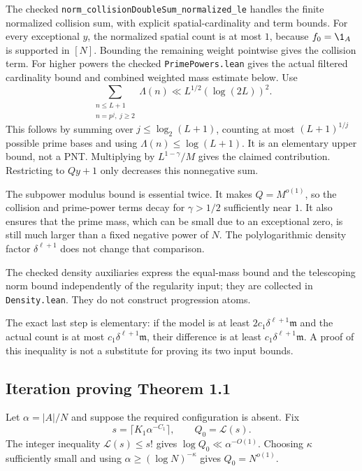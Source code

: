 The checked \texttt{norm\_\allowbreak{}collisionDoubleSum\_\allowbreak{}normalized\_\allowbreak{}le} handles the finite normalized collision sum, with explicit spatial-cardinality and term bounds. For every exceptional $y$, the normalized spatial count is at most $1$, because $f_0=\1_A$ is supported in $[N]$. Bounding the remaining weight pointwise gives the collision term. For higher powers the checked \texttt{PrimePowers.lean} gives the actual filtered cardinality bound and combined weighted mass estimate below. Use
\[
 \sum_{\substack{n\leq L+1\\n=p^j,\ j\geq2}}\Lambda(n)
 \ll L^{1/2}(\log(2L))^2.
\]
This follows by summing over $j\leq\log_2(L+1)$, counting at most $(L+1)^{1/j}$ possible prime bases and using $\Lambda(n)\leq\log(L+1)$. It is an elementary upper bound, not a PNT. Multiplying by $L^{1-\gamma}/M$ gives the claimed contribution. Restricting to $Qy+1$ only decreases this nonnegative sum.

The subpower modulus bound is essential twice. It makes $Q=M^{o(1)}$, so the collision and prime-power terms decay for $\gamma>1/2$ sufficiently near $1$. It also ensures that the prime mass, which can be small due to an exceptional zero, is still much larger than a fixed negative power of $N$. The polylogarithmic density factor $\delta^{\ell+1}$ does not change that comparison.

The checked density auxiliaries express the equal-mass bound and the telescoping norm bound independently of the regularity input; they are collected in \texttt{Density.lean}. They do not construct progression atoms.

The exact last step is elementary: if the model is at least $2c_1\delta^{\ell+1}\mathfrak m$ and the actual count is at most $c_1\delta^{\ell+1}\mathfrak m$, their difference is at least $c_1\delta^{\ell+1}\mathfrak m$. A proof of this inequality is not a substitute for proving its two input bounds.
\fi

\subsection*{Iteration proving Theorem 1.1}
\ifDetailed
Let $\alpha=|A|/N$ and suppose the required configuration is absent. Fix
\[
 s=\lceil K_1\alpha^{-C_1}\rceil,\qquad Q_0=\mathcal L(s).
\]
The integer inequality $\mathcal L(s)\leq s!$ gives $\log Q_0\ll\alpha^{-O(1)}$. Choosing $\kappa$ sufficiently small and using $\alpha\geq(\log N)^{-\kappa}$ gives $Q_0=N^{o(1)}$.

